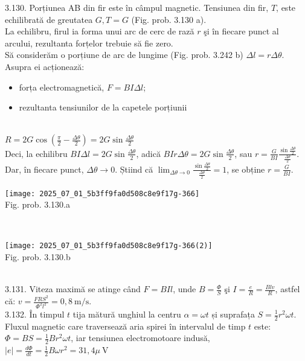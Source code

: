 3.130. Porțiunea AB din fir este în câmpul magnetic. Tensiunea din fir, $T$, este echilibrată de greutatea $G, T=G$ (Fig. prob. 3.130 a).\\ La echilibru, firul ia forma unui arc de cerc de rază $r$ şi în fiecare punct al arcului, rezultanta forțelor trebuie să fie zero.\\ Să considerăm o porțiune de arc de lungime (Fig. prob. 3.242 b) $\Delta l=r \Delta \theta$.\\ Asupra ei acționează:\\ \begin{itemize} \item forța electromagnetică, $F=B I \Delta l$; \item rezultanta tensiunilor de la capetele porțiunii \end{itemize}\\ $R=2 G \cos \left(\frac{\pi}{2}-\frac{\Delta \theta}{2}\right)=2 G \sin \frac{\Delta \theta}{2}$\\ Deci, la echilibru $B I \Delta l=2 G \sin \frac{\Delta \theta}{2}$, adică $B I r \Delta \theta=2 G \sin \frac{\Delta \theta}{2}$, sau $r=\frac{G}{B I} \frac{\sin \frac{\Delta \theta}{2}}{\frac{\Delta \theta}{2}}$.\\ Dar, în fiecare punct, $\Delta \theta \rightarrow 0$. Știind că $\lim _{\Delta \theta \rightarrow 0} \frac{\sin \frac{\Delta \theta}{2}}{\frac{\Delta \theta}{2}}=1$, se obține $r=\frac{G}{B I}$.\\ \begin{center} \texttt{[image: 2025\_07\_01\_5b3ff9fa0d508c8e9f17g-366]}\\ Fig. prob. 3.130.a \end{center}\\ \begin{center} \texttt{[image: 2025\_07\_01\_5b3ff9fa0d508c8e9f17g-366(2)]}\\ Fig. prob. 3.130.b \end{center}\\

3.131. Viteza maximă se atinge când $F=B I l$, unde $B=\frac{\Phi}{S}$ şi $I=\frac{e}{R}=\frac{B l v}{R}$, astfel că: $v=\frac{F R S^{2}}{\Phi^{2} l^{2}}=0,8 \mathrm{~m} / \mathrm{s}$.\\

3.132. În timpul $t$ tija mătură unghiul la centru $\alpha=\omega t$ și suprafața $S=\frac{1}{2} r^{2} \omega t$. Fluxul magnetic care traversează aria spirei în intervalul de timp $t$ este: $\Phi=B S=\frac{1}{2} B r^{2} \omega t$, iar tensiunea electromotoare indusă,\\ $|e|=\frac{d \Phi}{d t}=\frac{1}{2} B \omega r^{2}=31,4 \mu \mathrm{~V}$\\

